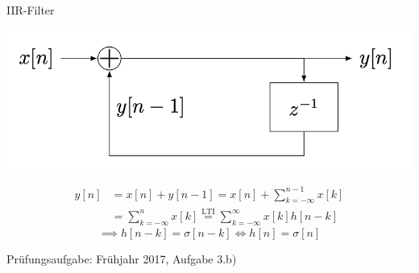 \documentclass[14pt, aspectratio=169, handout]{beamer}
\begin{document}
\begin{frame}{IIR-Filter}
\begin{center}
        \includegraphics[width=0.4\linewidth]{figures/IIR.png}
    \end{center}
    \vspace*{-0.5cm}
    \begin{align*}
        y[n] &= x[n] + y[n-1] = x[n] + \sum_{k=-\infty}^{n-1}x[k] \\
        &= \sum_{k=-\infty}^n x[k] \overset{\text{LTI}}{=} \sum_{k=-\infty}^\infty x[k]h[n-k]
    \end{align*}
    $$\implies h[n-k] = \sigma[n-k] \Leftrightarrow h[n] = \sigma[n]$$
\end{frame}

\begin{frame}{Prüfungsaufgabe: Frühjahr 2017, Aufgabe 3.b)}
    
\end{frame}
\end{document}
